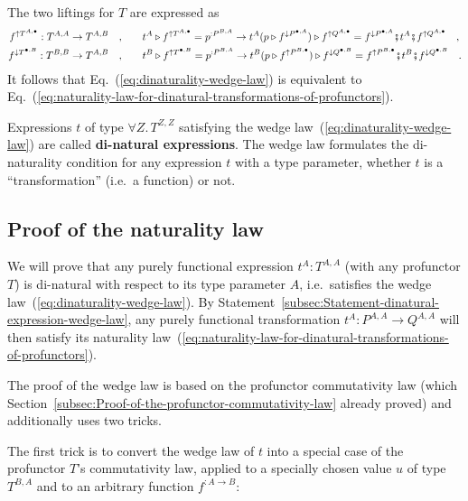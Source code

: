 The two liftings for $T$ are expressed as
\begin{align*}
f^{\uparrow T^{A,\bullet}}:T^{A,A}\rightarrow T^{A,B}\quad, & \quad\quad t^{A}\triangleright f^{\uparrow T^{A,\bullet}}=p^{:P^{B,A}}\rightarrow t^{A}(p\triangleright f^{\downarrow P^{\bullet,A}})\triangleright f^{\uparrow Q^{A,\bullet}}=f^{\downarrow P^{\bullet,A}}\bef t^{A}\bef f^{\uparrow Q^{A,\bullet}}\quad,\\
f^{\downarrow T^{\bullet,B}}:T^{B,B}\rightarrow T^{A,B}\quad, & \quad\quad t^{B}\triangleright f^{\uparrow T^{\bullet,B}}=p^{:P^{B,A}}\rightarrow t^{B}(p\triangleright f^{\uparrow P^{B,\bullet}})\triangleright f^{\downarrow Q^{\bullet,B}}=f^{\uparrow P^{B,\bullet}}\bef t^{B}\bef f^{\downarrow Q^{\bullet,B}}\quad.
\end{align*}
It follows that Eq.~(\ref{eq:dinaturality-wedge-law}) is equivalent
to Eq.~(\ref{eq:naturality-law-for-dinatural-transformations-of-profunctors}).

Expressions $t$ of type $\forall Z.\,T^{Z,Z}$ satisfying the wedge
law~(\ref{eq:dinaturality-wedge-law}) are called \textbf{di-natural
expressions}. The wedge law formulates
the di-naturality condition for any expression $t$ with a type parameter,
whether $t$ is a ``transformation'' (i.e.~a function) or not.

\subsection{Proof of the naturality law}

We will prove that any purely functional expression $t^{A}:T^{A,A}$
(with any profunctor $T$) is di-natural with respect to its type
parameter $A$, i.e.~satisfies the wedge law~(\ref{eq:dinaturality-wedge-law}).
By Statement~\ref{subsec:Statement-dinatural-expression-wedge-law},
any purely functional transformation $t^{A}:P^{A,A}\rightarrow Q^{A,A}$
will then satisfy its naturality law~(\ref{eq:naturality-law-for-dinatural-transformations-of-profunctors}).

The proof of the wedge law is based on the profunctor commutativity
law (which Section~\ref{subsec:Proof-of-the-profunctor-commutativity-law}
already proved) and additionally uses two tricks. 

The first trick is to convert the wedge law of $t$ into a special
case of the profunctor $T$'s commutativity law, applied to a specially
chosen value $u$ of type $T^{B,A}$ and to an arbitrary function
$f^{:A\rightarrow B}$:


